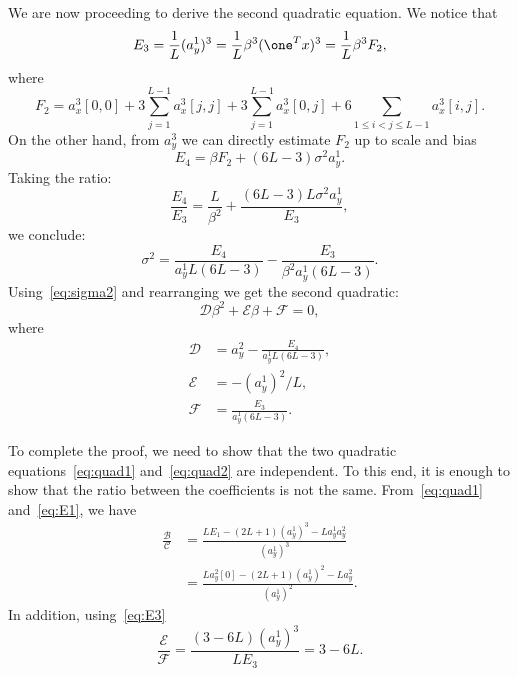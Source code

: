 \documentclass[9pt,twocolumn,twoside,lineno]{pnas-new}
\begin{document}
We are now proceeding to derive the second quadratic equation. We notice that 
\begin{equation} \label{eq:E3}
E_3  = \frac{1}{L}(a_y^1)^3 = \frac{1}{L}\beta^3 (\one ^Tx)^3   = \frac{1}{L}\beta^3 F_2,
\end{equation}
where 
\begin{equation*}
F_2 =  a_x^3[0,0] + 3\sum_{j=1}^{L-1}a_x^3[j,j] + 3\sum_{j=1}^{L-1}a_x^3[0,j] + 6\sum_{1\leq i < j\leq L-1}a_x^3[i,j].
\end{equation*}
On the other hand, from $a_y^3$ we can directly estimate $F_2$ up to scale and bias
\begin{equation} \label{eq:E4}
E_4 = \beta F_2 + (6L-3)\sigma^2a_y^1.
\end{equation}
Taking the ratio:
\begin{equation*} 
\frac{E_4}{E_3} = \frac{L}{\beta^2} + \frac{(6L-3)L\sigma^2a_y^1}{E_3}, 
\end{equation*}
we conclude:
\begin{equation*}
\sigma^2 = \frac{E_4}{a_y^1L(6L-3)}  - \frac{E_3}{\beta^2a_y^1(6L-3)}.
\end{equation*}
Using~\eqref{eq:sigma2} and rearranging we get the second quadratic:
\begin{equation} \label{eq:quad2}
\mathcal{D}\beta^2 + \mathcal{E}\beta + \mathcal{F} = 0,
\end{equation}
where
\begin{align*}
\mathcal{D} &= a_y^2 - \frac{E_4}{a_y^1L(6L-3)}, \\ 
\mathcal{E} &= -(a_y^1)^2/L, \\
\mathcal{F} &= \frac{E_3}{a_y^1(6L-3)}.
\end{align*}

To complete the proof, we need to show that the two quadratic equations~\eqref{eq:quad1} and~\eqref{eq:quad2} are independent. To this end, it is enough to show that the ratio between the coefficients is not the same. 
From~\eqref{eq:quad1} and~\eqref{eq:E1}, we have 
\begin{equation*}
\begin{split}
\frac{\mathcal{B}}{\mathcal{C}} &= \frac{LE_1 - (2L+1)(a_y^1)^3 - La_y^1a_y^2}{(a_y^1)^3} \\&= \frac{La_y^2[0] - (2L+1)(a_y^1)^2 - La_y^2}{(a_y^1)^2}.
\end{split}
\end{equation*}
In addition, using~\eqref{eq:E3}
\begin{equation*}
\frac{\mathcal{E}}{\mathcal{F}} = \frac{(3-6L)(a_y^1)^3}{LE_3} = 3 - 6L . 
\end{equation*}
\end{document}
